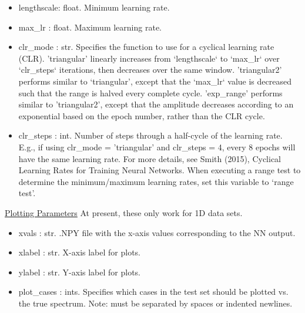 \documentclass[letterpaper, 12pt]{article}
\begin{document}
\begin{itemize}
\item lengthscale: float. Minimum learning rate.
\item max\_lr     : float. Maximum learning rate.
\item clr\_mode   : str.   Specifies the function to use for a cyclical learning rate 
                    (CLR).
                    'triangular' linearly increases from `lengthscale` to 
                    `max\_lr` over `clr\_steps` iterations, then decreases over the same 
                    window.
                    'triangular2' performs similar to `triangular', except that 
                    the `max\_lr` value is decreased such that the range is halved every 
                    complete cycle.
                    'exp\_range' performs similar to 'triangular2', except that 
                    the amplitude decreases according to an exponential based 
                    on the epoch number, rather than the CLR cycle.
\item clr\_steps  : int.   Number of steps through a half-cycle of the learning rate.
                    E.g., if using clr\_mode = 'triangular' and clr\_steps = 4, 
                    every 8 epochs will have the same learning rate.
                    For more details, see Smith (2015), Cyclical Learning Rates 
                    for Training Neural Networks.
                    When executing a range test to determine the minimum/maximum
                    learning rates, set this variable to `range test'.
\end{itemize}

\noindent \underline{Plotting Parameters}\newline
\noindent At present, these only work for 1D data sets.
\begin{itemize}
\item xvals       : str.  .NPY file with the x-axis values corresponding to 
                          the NN output.
\item xlabel      : str.  X-axis label for plots.
\item ylabel      : str.  Y-axis label for plots.
\item plot\_cases : ints. Specifies which cases in the test set should be 
                   plotted vs. the true spectrum.
                   Note: must be separated by spaces or indented newlines.
\end{itemize}
\end{document}
